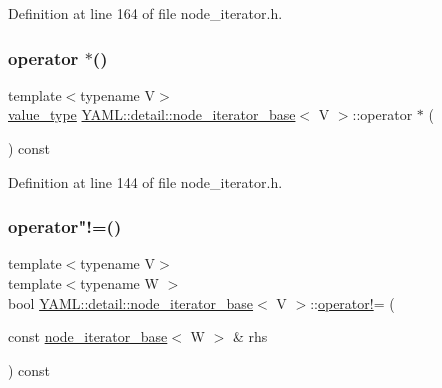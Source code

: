 Definition at line 164 of file node\+\_\+iterator.\+h.

\mbox{\label{class_y_a_m_l_1_1detail_1_1node__iterator__base_a324b02524e04bba795507717d0414cfb}} 
\subsubsection{\texorpdfstring{operator $\ast$()}{operator *()}}
{\footnotesize\ttfamily template$<$typename V$>$ \\
\mbox{\hyperlink{class_y_a_m_l_1_1detail_1_1node__iterator__base_ac091253ed737c52668c9f9d84bdfd777}{value\+\_\+type}} \mbox{\hyperlink{class_y_a_m_l_1_1detail_1_1node__iterator__base}{Y\+A\+M\+L\+::detail\+::node\+\_\+iterator\+\_\+base}}$<$ V $>$\+::operator $\ast$ (\begin{DoxyParamCaption}{ }\end{DoxyParamCaption}) const\hspace{0.3cm}{\ttfamily [inline]}}



Definition at line 144 of file node\+\_\+iterator.\+h.

\mbox{\label{class_y_a_m_l_1_1detail_1_1node__iterator__base_a13d72e654af51b92c078864bddd9322d}} 
\subsubsection{\texorpdfstring{operator"!=()}{operator!=()}}
{\footnotesize\ttfamily template$<$typename V$>$ \\
template$<$typename W $>$ \\
bool \mbox{\hyperlink{class_y_a_m_l_1_1detail_1_1node__iterator__base}{Y\+A\+M\+L\+::detail\+::node\+\_\+iterator\+\_\+base}}$<$ V $>$\+::\mbox{\hyperlink{namespace_y_a_m_l_a1e1f522940ab0016a28e1969ba4846c2}{operator!}}= (\begin{DoxyParamCaption}\item[{const \mbox{\hyperlink{class_y_a_m_l_1_1detail_1_1node__iterator__base}{node\+\_\+iterator\+\_\+base}}$<$ W $>$ \&}]{rhs }\end{DoxyParamCaption}) const\hspace{0.3cm}{\ttfamily [inline]}}




